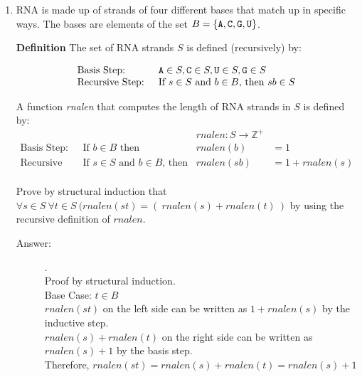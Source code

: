 \documentclass[12pt, oneside]{article}
\begin{document}
\begin{enumerate}
            \item RNA is made up of strands of four different bases that match up in
            specific ways. The bases are elements of the set 
            $B  = \{\texttt{A}, \texttt{C}, \texttt{G}, \texttt{U} \}$.
            
            \label{roster_RNA}
            
            {\bf Definition} The set of RNA strands $S$ is defined (recursively) by:
            
            \[
            \begin{array}{ll}
            \textrm{Basis Step: } & \texttt{A} \in S, \texttt{C} \in S, \texttt{U} \in S, \texttt{G} \in S \\
            \textrm{Recursive Step: } & \textrm{If } s \in S\textrm{ and }b \in B \textrm{, then }sb \in S
            \end{array}
            \]
            
            A function \textit{rnalen} that computes the length of RNA strands in $S$ is defined by:
            \[
            \begin{array}{llll}
            & & \textit{rnalen}:S\to \mathbb{Z}^+ \\
            \textrm{Basis Step:} & \textrm{If } b \in B\textrm{ then } & \textit{rnalen}(b) & = 1 \\
            \textrm{Recursive Step:} & \textrm{If } s \in S\textrm{ and }b \in B\textrm{, then  } & \textit{rnalen}(sb) & = 1 + \textit{rnalen}(s)
            \end{array}
            \] \\
            Prove by structural induction that $\forall s \in S~\forall t \in S~(rnalen(st) = (~rnalen(s) + rnalen(t)~)$ by using the recursive definition of $rnalen$.
            
            \begin{description}
                \item[Answer:] .\\
                Proof by structural induction.\\
                
                Base Case: $t \in B$ \\
                $rnalen(st)$ on the left side can be written as $1 + rnalen(s)$ by the inductive step.\\
                $rnalen(s) + rnalen(t)$ on the right side can be written as $rnalen(s) + 1$ by the basis step. \\
                Therefore, $rnalen(st) = rnalen(s) + rnalen(t) = rnalen(s) + 1$ \\


\end{description}
\end{enumerate}
\end{document}
